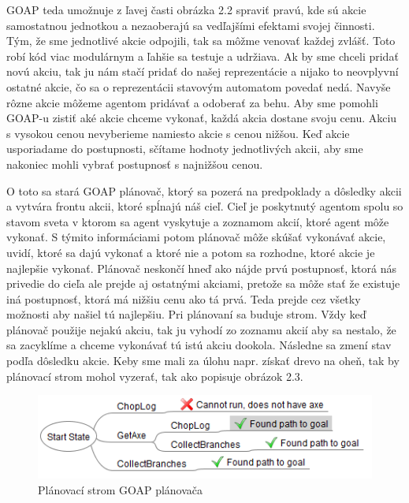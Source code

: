 GOAP teda umožnuje z ľavej časti obrázka 2.2 spraviť pravú, kde sú akcie samostatnou jednotkou a nezaoberajú sa vedľajšími efektami svojej činnosti. Tým, že sme jednotlivé akcie odpojili, tak sa môžme venovať každej zvlášť. Toto robí kód viac modulárnym a ľahšie sa testuje a udržiava. Ak by sme chceli pridať novú akciu, tak ju nám stačí pridať do našej reprezentácie a nijako to neovplyvní ostatné akcie, čo sa o reprezentácii stavovým automatom povedať nedá. Navyše rôzne akcie môžeme agentom pridávať a odoberať za behu. Aby sme pomohli GOAP-u zistiť aké akcie chceme vykonať, každá akcia dostane svoju cenu. Akciu s vysokou cenou nevyberieme namiesto akcie s cenou nižšou. Keď akcie usporiadame do postupnosti, sčítame hodnoty jednotlivých akcii, aby sme nakoniec mohli vybrať postupnosť s najnižšou cenou.\par
O toto sa stará GOAP plánovač, ktorý sa pozerá na predpoklady a dôsledky akcii a vytvára frontu akcii, ktoré spĺnajú náš cieľ. Cieľ je poskytnutý agentom spolu so stavom sveta v ktorom sa agent vyskytuje a zoznamom akcií, ktoré agent môže vykonať. S týmito informáciami potom plánovač môže skúšať vykonávať akcie, uvidí, ktoré sa dajú vykonať a ktoré nie a potom sa rozhodne, ktoré akcie je najlepšie vykonať. Plánovač neskončí hneď ako nájde prvú postupnosť, ktorá nás privedie do cieľa ale prejde aj ostatnými akciami, pretože sa môže stať že existuje iná postupnosť, ktorá má nižšiu cenu ako tá prvá. Teda prejde cez všetky možnosti aby našiel tú najlepšiu. Pri plánovaní sa buduje strom. Vždy keď plánovač použije nejakú akciu, tak ju vyhodí zo zoznamu akcií aby sa nestalo, že sa zacyklíme a chceme vykonávať tú istú akciu dookola. Následne sa zmení stav podľa dôsledku akcie. Keby sme mali za úlohu napr. získať drevo na oheň, tak by plánovací strom mohol vyzerať, tak ako popisuje obrázok 2.3.
\begin{figure}[H] 
\begin{center}
\includegraphics[scale=1.0]{img/plan_tree.png}
\caption{Plánovací strom GOAP plánovača \cite{goap}}
\label{fig:ch23}
\end{center}
\end{figure}
